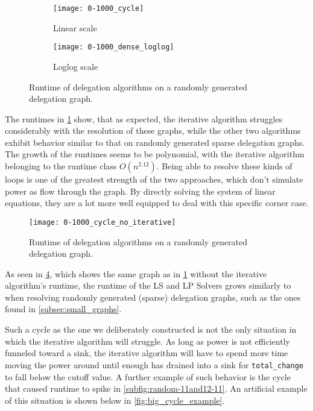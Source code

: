 \begin{figure}[t]
    \centering
    \begin{subfigure}[t]{0.45\textwidth}
    	\centering
    	\texttt{[image: 0-1000\_cycle]}
    	\caption{Linear scale}
    	\label{subfig:cycle-small-linear}
    \end{subfigure}
    \hfill
    \begin{subfigure}[t]{0.45\textwidth}
        \centering
        \texttt{[image: 0-1000\_dense\_loglog]}
        \caption{Loglog scale}
         \label{subfig:cycle-small-loglog}
    \end{subfigure}
    \caption{Runtime of delegation algorithms on a randomly generated delegation graph.}
    \label{fig:cycle_small}
\end{figure}

The runtimes in \cref{subfig:cycle-small-linear} show, that as expected, the iterative algorithm struggles considerably with the resolution of these graphs, while the other two algorithms exhibit behavior similar to that on randomly generated sparse delegation graphs. The growth of the runtimes seems to be polynomial, with the iterative algorithm belonging to the runtime class $O(n^{2.12})$. Being able to resolve these kinds of loops is one of the greatest strength of the two approaches, which don't simulate power as flow through the graph. By directly solving the system of linear equations, they are a lot more well equipped to deal with this specific corner case.  

\begin{figure}[t]
	\centering
    	\texttt{[image: 0-1000\_cycle\_no\_iterative]}
    	\caption{Runtime of delegation algorithms on a randomly generated delegation graph.}
	\label{fig:cycle-small-no-iterative-linear}
\end{figure}

As seen in \cref{fig:cycle-small-no-iterative-linear}, which shows the same graph as in \cref{subfig:cycle-small-linear} without the iterative algorithm's runtime, the runtime of the LS and LP Solvers grows similarly to when resolving randomly generated (sparse) delegation graphs, such as the ones found in \cref{subsec:small_graphs}.

Such a cycle as the one we deliberately constructed is not the only situation in which the iterative algorithm will struggle. As long as power is not efficiently funneled toward a sink, the iterative algorithm will have to spend more time moving the power around until enough has drained into a sink for \texttt{total\_change} to fall below the cutoff value. A further example of such behavior is the cycle that caused runtime to spike in \cref{subfig:random-11and12-11}. An artificial example of this situation is shown below in \cref{fig:big_cycle_example}.

